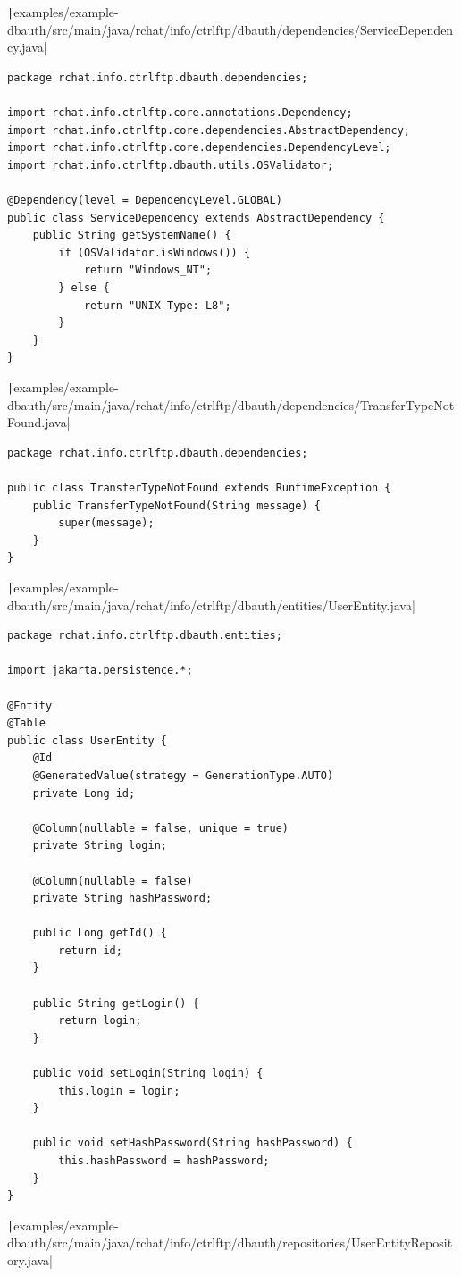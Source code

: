 \documentclass[a4paper,14pt]{extarticle}
\begin{document}
\texttt|examples/example-dbauth/src/main/java/rchat/info/ctrlftp/dbauth/dependencies/ServiceDependency.java|
\begin{verbatim}
package rchat.info.ctrlftp.dbauth.dependencies;

import rchat.info.ctrlftp.core.annotations.Dependency;
import rchat.info.ctrlftp.core.dependencies.AbstractDependency;
import rchat.info.ctrlftp.core.dependencies.DependencyLevel;
import rchat.info.ctrlftp.dbauth.utils.OSValidator;

@Dependency(level = DependencyLevel.GLOBAL)
public class ServiceDependency extends AbstractDependency {
    public String getSystemName() {
        if (OSValidator.isWindows()) {
            return "Windows_NT";
        } else {
            return "UNIX Type: L8";
        }
    }
}
\end{verbatim}
\texttt|examples/example-dbauth/src/main/java/rchat/info/ctrlftp/dbauth/dependencies/TransferTypeNotFound.java|
\begin{verbatim}
package rchat.info.ctrlftp.dbauth.dependencies;

public class TransferTypeNotFound extends RuntimeException {
    public TransferTypeNotFound(String message) {
        super(message);
    }
}
\end{verbatim}
\texttt|examples/example-dbauth/src/main/java/rchat/info/ctrlftp/dbauth/entities/UserEntity.java|
\begin{verbatim}
package rchat.info.ctrlftp.dbauth.entities;

import jakarta.persistence.*;

@Entity
@Table
public class UserEntity {
    @Id
    @GeneratedValue(strategy = GenerationType.AUTO)
    private Long id;

    @Column(nullable = false, unique = true)
    private String login;

    @Column(nullable = false)
    private String hashPassword;

    public Long getId() {
        return id;
    }

    public String getLogin() {
        return login;
    }

    public void setLogin(String login) {
        this.login = login;
    }

    public void setHashPassword(String hashPassword) {
        this.hashPassword = hashPassword;
    }
}
\end{verbatim}
\texttt|examples/example-dbauth/src/main/java/rchat/info/ctrlftp/dbauth/repositories/UserEntityRepository.java|
\end{document}
